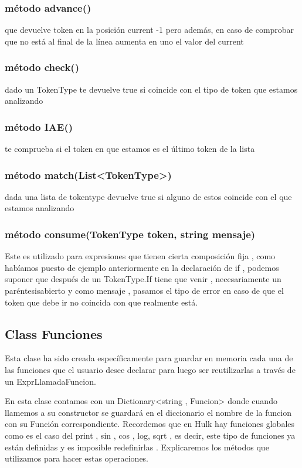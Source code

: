 \documentclass[a4paper,12pt]{article}
\begin{document}
\subsubsection[short]{método advance()} 
que devuelve token en la posición current -1 pero además,  en caso de comprobar que no está al final de la línea aumenta en uno el valor del current

\subsubsection[short]{método check()}  
dado un TokenType te devuelve true si coincide con el tipo de token que estamos analizando

\subsubsection[short]{método IAE()}  
te comprueba si el token en que estamos es el último token de la lista 

\subsubsection[short]{método match(List<TokenType>)} 
dada una lista de tokentype devuelve true si alguno de estos coincide con el que estamos analizando 

\subsubsection[short]{método consume(TokenType token, string mensaje)}  
Este es utilizado para expresiones que tienen cierta composición fija , como habíamos puesto de ejemplo anteriormente en la declaración de if , podemos suponer que después de un TokenType.If  tiene que venir , necesariamente un paréntesisabierto y como mensaje , pasamos el tipo de error en caso de que el token que debe ir no coincida con que realmente está.

\subsection{Class Funciones}
Esta clase ha sido creada específicamente para guardar en memoria cada una de las funciones 
que el usuario desee declarar para luego ser reutilizarlas a través de un ExprLlamadaFuncion.

En esta clase contamos con un Dictionary<string , Funcion> donde cuando llamemos a su constructor 
se guardará en el diccionario el nombre de la funcion con su Función correspondiente.
Recordemos que en Hulk hay funciones globales como es el caso del print , sin , cos , log, sqrt , 
es decir, este tipo de funciones ya están definidas y es imposible redefinirlas . 
Explicaremos los métodos que utilizamos para hacer estas operaciones.
\end{document}
